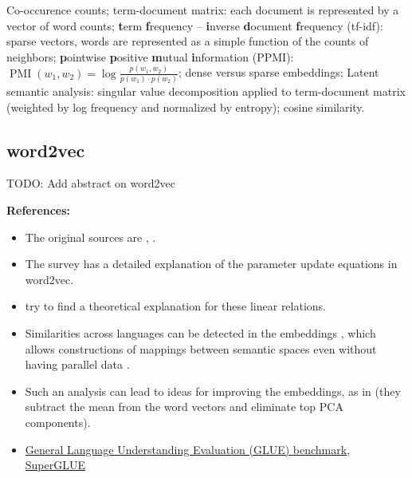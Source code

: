 \documentclass[11pt, a4paper]{amsart}
\begin{document}
{
	\color{blue}
	
	Co-occurence counts;
	term-document matrix: each document is represented by a vector of word counts;
	\textbf{t}erm \textbf{f}requency -- \textbf{i}nverse \textbf{d}ocument \textbf{f}requency (tf-idf):
	sparse vectors, words are represented as a simple function of the counts of neighbors;
	\textbf{p}ointwise \textbf{p}ositive \textbf{m}utual \textbf{i}nformation (PPMI):
	$\operatorname{PMI}(w_{1}, w_{2}) = \log \frac{p(w_{1}, w_{2})}{p(w_{1}) \cdot p(w_{2})}$;
	dense versus sparse embeddings;
	Latent semantic analysis:
	singular value decomposition applied to term-document matrix (weighted by log frequency and normalized by entropy);
	cosine similarity.
} %

\subsection{word2vec}

TODO: Add abstract on word2vec

\noindent \textbf{References:}
\begin{itemize}
	\item The original sources are
	\cite{DBLP:journals/corr/abs-1301-3781},
	\cite{DBLP:journals/corr/MikolovSCCD13}.
	\item The survey \cite{DBLP:journals/corr/Rong14} has a detailed explanation of the parameter update equations in word2vec.
    \item \cite{DBLP:journals/corr/abs-1901-09813} try to find a theoretical explanation for these linear relations.
    \item Similarities across languages can be detected in the embeddings \cite{DBLP:journals/corr/MikolovLS13}, which allows constructions of mappings between semantic spaces even without having parallel data \cite{DBLP:journals/corr/abs-1710-04087}.
    \item Such an analysis can lead to ideas for improving the embeddings, as in \cite{DBLP:journals/corr/MuBV17} (they subtract the mean from the word vectors and eliminate top PCA components).
    \item \href{https://gluebenchmark.com/}{General Language Understanding Evaluation (GLUE) benchmark}, \href{https://super.gluebenchmark.com/}{SuperGLUE}
\end{itemize}
\end{document}
